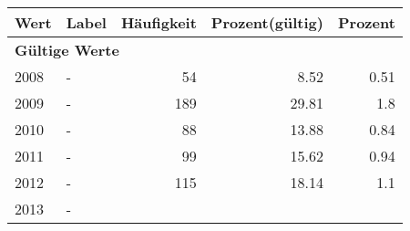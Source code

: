      \begin{longtable}{lXrrr}
     \toprule
     \textbf{Wert} & \textbf{Label} & \textbf{Häufigkeit} & \textbf{Prozent(gültig)} & \textbf{Prozent} \\
     \endhead
     \midrule
     \multicolumn{5}{l}{\textbf{Gültige Werte}}\\

     2008 &
     \multicolumn{1}{X}{ -  } &


       \num{54} &
       \num[round-mode=places,round-precision=2]{8.52} &
         \num[round-mode=places,round-precision=2]{0.51} \\

     2009 &
     \multicolumn{1}{X}{ -  } &


       \num{189} &
       \num[round-mode=places,round-precision=2]{29.81} &
         \num[round-mode=places,round-precision=2]{1.8} \\

     2010 &
     \multicolumn{1}{X}{ -  } &


       \num{88} &
       \num[round-mode=places,round-precision=2]{13.88} &
         \num[round-mode=places,round-precision=2]{0.84} \\

     2011 &
     \multicolumn{1}{X}{ -  } &


       \num{99} &
       \num[round-mode=places,round-precision=2]{15.62} &
         \num[round-mode=places,round-precision=2]{0.94} \\

     2012 &
     \multicolumn{1}{X}{ -  } &


       \num{115} &
       \num[round-mode=places,round-precision=2]{18.14} &
         \num[round-mode=places,round-precision=2]{1.1} \\

     2013 &
     \multicolumn{1}{X}{ -  } &



\end{longtable}
